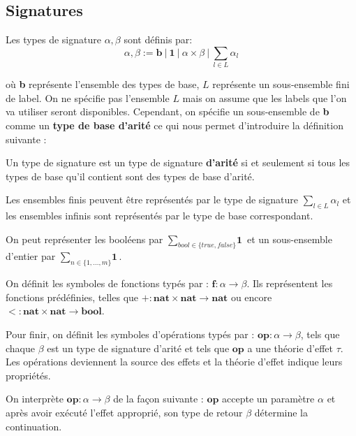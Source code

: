 \subsection{Signatures}

	Les types de signature $\alpha,\beta$ sont définis par:
	\[\alpha,\beta := \textbf{b}~|~\textbf{1}~|~\alpha \times \beta~|~\sum_{l \in L}\alpha_l\]
			
	où \textbf{b} représente l'ensemble des types de base, $L$ représente un sous-ensemble fini de label. On ne spécifie pas l'ensemble $L$ mais on assume que les labels que l'on va utiliser seront disponibles. Cependant, on spécifie un sous-ensemble de \textbf{b} comme un \textbf{type de base d'arité} ce qui nous permet d'introduire la définition suivante : 
	
	\begin{definition}
		Un type de signature est un type de signature \textbf{d'arité} si et seulement si tous les types de base qu'il contient sont des types de base d'arité.
	\end{definition}
	
	Les ensembles finis peuvent être représentés par le type de signature $\sum_{l \in L}\alpha_l$ et les ensembles infinis sont représentés par le type de base correspondant.
	
	\begin{exemple}
		On peut représenter les booléens par  $\sum_{bool \in \{true,false\}} \textbf{1}$ et un sous-ensemble d'entier par $\sum_{n \in \{1,...,m\}}\textbf{1}$.
	\end{exemple}
	\bigbreak


	On définit les symboles de fonctions typés par : $\textbf{f} : \alpha \rightarrow \beta$. Ils représentent les fonctions prédéfinies, telles que $+ : \textbf{nat} \times \textbf{nat} \rightarrow \textbf{nat}$ ou encore $< : \textbf{nat} \times \textbf{nat} \rightarrow \textbf{bool}$.
	\medbreak

	Pour finir, on définit les symboles d'opérations typés par : $\textbf{op} : \alpha \rightarrow \beta$, tels que chaque $\beta$ est un type de signature d'arité et tels que $\textbf{op}$ a une théorie d'effet $\tau$. Les opérations deviennent la source des effets et la théorie d'effet indique leurs propriétés.
	


	On interprète $\textbf{op} : \alpha \rightarrow \beta$ de la façon suivante :
	$\textbf{op}$ accepte un paramètre $\alpha$ et après avoir exécuté l'effet approprié, son type de retour $\beta$ détermine la continuation.
	\medbreak
	
